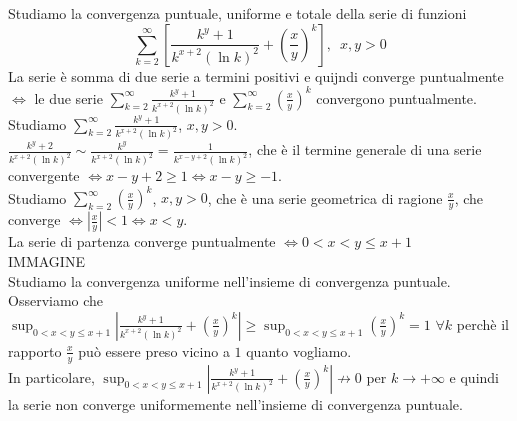 \begin{exbar}
\begin{example}
	Studiamo la convergenza puntuale, uniforme e totale della serie di funzioni \begin{equation*}
		\sum_{k=2}^{\infty}\left[\frac{k^y+1}{k^{x+2}(\ln k)^2} +\left( \frac{x}{y} \right)^k\right], \,\,\, x,y >0
	\end{equation*} 
	La serie è somma di due serie a termini positivi e quijndi converge puntualmente $\Leftrightarrow$ le due serie $\sum_{k=2}^{\infty} \frac{k^y+1}{k^{x+2}(\ln k)^2}$ e $\sum_{k=2}^{\infty}  \left( \frac{x}{y} \right)^k$ convergono puntualmente.\\
	Studiamo $\sum_{k=2}^{\infty} \frac{k^y+1}{k^{x+2}(\ln k)^2}$, $x,y >0$.\\
	$\frac{k^y+2}{k^{x+2}(\ln k)^2} \sim \frac{k^y}{k^{x+2}(\ln k)^2}=\frac{1}{k^{x-y+2}(\ln k)^2}$, che è il termine generale di una serie convergente $\Leftrightarrow x-y+2 \geq 1 \Leftrightarrow x-y \geq -1$.\\
	Studiamo $\sum_{k=2}^{\infty} \left(\frac{x}{y}\right)^k$, $x,y>0$, che è una serie geometrica di ragione $\frac{x}{y}$, che converge $\Leftrightarrow |\frac{x}{y}|< 1 \Leftrightarrow x <y$.\\
	La serie di partenza converge puntualmente $\Leftrightarrow 0<x<y\leq x+1$\\
	IMMAGINE\\
	Studiamo la convergenza uniforme nell'insieme di convergenza puntuale.\\
	Osserviamo che $\sup_{0<x< y\leq x+1}|\frac{k^y+1}{k^{x+2}(\ln k)^2}+\left( \frac{x}{y}\right)^k|\geq  \sup_{0<x< y\leq x+1} \left( \frac{x}{y}\right)^k=1\,\, \forall k$ perchè il rapporto $\frac{x}{y}$ può essere preso vicino a $1$ quanto vogliamo.\\
	In particolare, $\sup_{0<x< y\leq x+1}|\frac{k^y+1}{k^{x+2}(\ln k)^2}+\left( \frac{x}{y}\right)^k|\nrightarrow 0$ per $k \rightarrow +\infty$ e quindi la serie non converge uniformemente nell'insieme di convergenza puntuale.
\end{example}
\end{exbar}








